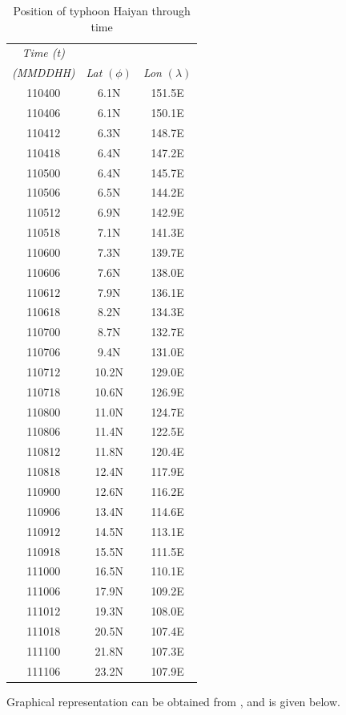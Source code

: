 \documentclass[a4paper, 11pt]{article}
\begin{document}
\begin{table}[H]
	\centering
	\begin{tabular}[H]{c | c c}
		\textit{Time (t)} & &\\
		\textit{(MMDDHH)} & \textit{Lat} $(\phi)$ & \textit{Lon} $(\lambda)$ \\
		\hline
		110400 & 6.1N & 151.5E \\
		110406 & 6.1N & 150.1E \\
		110412 & 6.3N & 148.7E \\
		110418 & 6.4N & 147.2E \\
		110500 & 6.4N & 145.7E \\
		110506 & 6.5N & 144.2E \\
		110512 & 6.9N & 142.9E \\
		110518 & 7.1N & 141.3E \\
		110600 & 7.3N & 139.7E \\
		110606 & 7.6N & 138.0E \\
		110612 & 7.9N & 136.1E \\
		110618 & 8.2N & 134.3E \\
		110700 & 8.7N & 132.7E \\
		110706 & 9.4N & 131.0E \\
		110712 & 10.2N & 129.0E \\
		110718 & 10.6N & 126.9E \\
		110800 & 11.0N & 124.7E \\
		110806 & 11.4N & 122.5E \\
		110812 & 11.8N & 120.4E \\
		110818 & 12.4N & 117.9E \\
		110900 & 12.6N & 116.2E \\
		110906 & 13.4N & 114.6E \\
		110912 & 14.5N & 113.1E \\
		110918 & 15.5N & 111.5E \\
		111000 & 16.5N & 110.1E \\
		111006 & 17.9N & 109.2E \\
		111012 & 19.3N & 108.0E \\
		111018 & 20.5N & 107.4E \\
		111100 & 21.8N & 107.3E \\
		111106 & 23.2N & 107.9E \\
	\end{tabular}
	\caption{Position of typhoon Haiyan through time}
	\label{tbl:pos}
\end{table}

Graphical representation can be obtained from \cite{bib:trackgraph}, and is given below.
\end{document}
